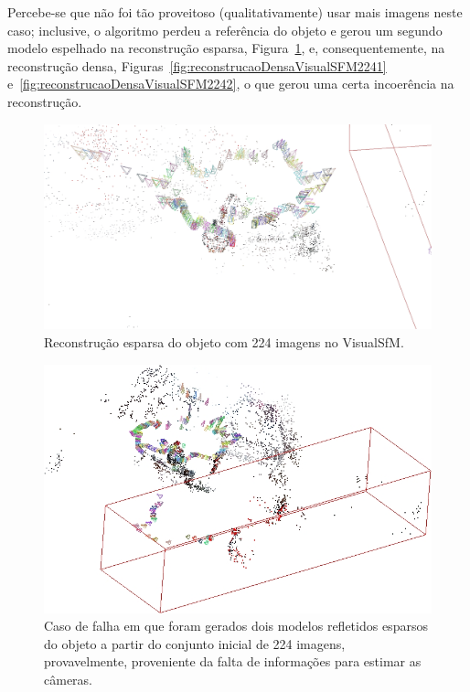 Percebe-se que não foi tão proveitoso (qualitativamente) usar mais imagens neste
caso; inclusive, o algoritmo perdeu a referência do objeto e gerou um segundo
modelo espelhado na reconstrução esparsa,
Figura~\ref{fig:reconstrucaoEsparsaVisualSFM224}, e, consequentemente, na
reconstrução densa,
Figuras~\ref{fig:reconstrucaoDensaVisualSFM2241} e~\ref{fig:reconstrucaoDensaVisualSFM2242}, o que gerou uma certa incoerência na reconstrução.

\begin{figure}[!h]
	\centering
	\includegraphics[width=\linewidth]{figs/perto_longe_esparsa.jpg}
	\caption{%
	Reconstrução esparsa do objeto com 224 imagens no VisualSfM.
	}\label{fig:reconstrucaoEsparsaVisualSFM224}
\end{figure}

\begin{figure}[!h]
	\centering
	\includegraphics[width=\linewidth]{figs/perto_longe_esparsa_2.jpg}
	\caption{%
	Caso de falha em que foram gerados dois modelos refletidos esparsos do objeto a partir
  do conjunto inicial de 224 imagens, provavelmente, proveniente da falta de
  informações para estimar as câmeras.
	}\label{fig:reconstrucaoEsparsaVisualSFM224:2}
\end{figure}

